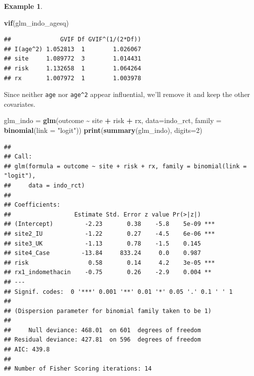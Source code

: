 \documentclass[
  openany]{book}
\newenvironment{Shaded}{\begin{snugshade}}{\end{snugshade}}
\newcommand{\AttributeTok}[1]{\textcolor[rgb]{0.13,0.29,0.53}{#1}}
\newcommand{\DecValTok}[1]{\textcolor[rgb]{0.00,0.00,0.81}{#1}}
\newcommand{\FunctionTok}[1]{\textcolor[rgb]{0.13,0.29,0.53}{\textbf{#1}}}
\newcommand{\NormalTok}[1]{#1}
\newcommand{\OtherTok}[1]{\textcolor[rgb]{0.56,0.35,0.01}{#1}}
\newcommand{\SpecialCharTok}[1]{\textcolor[rgb]{0.81,0.36,0.00}{\textbf{#1}}}
\newcommand{\StringTok}[1]{\textcolor[rgb]{0.31,0.60,0.02}{#1}}
\theoremstyle{definition}
\theoremstyle{definition}
\newtheorem{example}{Example}[chapter]
\theoremstyle{definition}
\theoremstyle{definition}
\theoremstyle{remark}
\begin{document}
\begin{example}
\begin{Shaded}
\begin{Highlighting}[]
\FunctionTok{vif}\NormalTok{(glm\_indo\_agesq)}
\end{Highlighting}
\end{Shaded}

\begin{verbatim}
##              GVIF Df GVIF^(1/(2*Df))
## I(age^2) 1.052813  1        1.026067
## site     1.089772  3        1.014431
## risk     1.132658  1        1.064264
## rx       1.007972  1        1.003978
\end{verbatim}

Since neither \texttt{age} nor \texttt{age\^{}2} appear influential, we'll remove it and keep the other covariates.

\begin{Shaded}
\begin{Highlighting}[]
\NormalTok{glm\_indo }\OtherTok{=} \FunctionTok{glm}\NormalTok{(outcome }\SpecialCharTok{\textasciitilde{}}\NormalTok{ site }\SpecialCharTok{+}\NormalTok{ risk }\SpecialCharTok{+}\NormalTok{ rx, }\AttributeTok{data=}\NormalTok{indo\_rct, }\AttributeTok{family =} \FunctionTok{binomial}\NormalTok{(}\AttributeTok{link =} \StringTok{"logit"}\NormalTok{))}
\FunctionTok{print}\NormalTok{(}\FunctionTok{summary}\NormalTok{(glm\_indo), }\AttributeTok{digits=}\DecValTok{2}\NormalTok{)}
\end{Highlighting}
\end{Shaded}

\begin{verbatim}
## 
## Call:
## glm(formula = outcome ~ site + risk + rx, family = binomial(link = "logit"), 
##     data = indo_rct)
## 
## Coefficients:
##                  Estimate Std. Error z value Pr(>|z|)    
## (Intercept)         -2.23       0.38    -5.8    5e-09 ***
## site2_IU            -1.22       0.27    -4.5    6e-06 ***
## site3_UK            -1.13       0.78    -1.5    0.145    
## site4_Case         -13.84     833.24     0.0    0.987    
## risk                 0.58       0.14     4.2    3e-05 ***
## rx1_indomethacin    -0.75       0.26    -2.9    0.004 ** 
## ---
## Signif. codes:  0 '***' 0.001 '**' 0.01 '*' 0.05 '.' 0.1 ' ' 1
## 
## (Dispersion parameter for binomial family taken to be 1)
## 
##     Null deviance: 468.01  on 601  degrees of freedom
## Residual deviance: 427.81  on 596  degrees of freedom
## AIC: 439.8
## 
## Number of Fisher Scoring iterations: 14
\end{verbatim}


\end{example}
\end{document}
